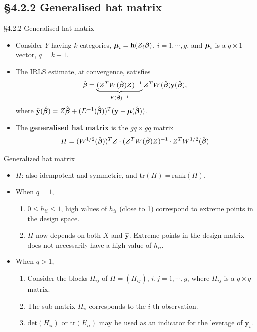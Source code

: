 \documentclass{beamer}
\newcommand{\currentsubsection}{}
\let\oldsubsection\subsection
\renewcommand{\subsection}[1]{\oldsubsection{#1}\renewcommand{\currentsubsection}{#1}}
\newenvironment{wideitemize}%
  {\begin{itemize}%
    \setlength{\parskip}{1em}}%
  {\end{itemize}}
\begin{document}
\subsection{\S4.2.2 Generalised hat matrix}
\begin{frame}{\S4.2.2 Generalised hat matrix}
\begin{wideitemize}

\item
Consider $Y$ having $k$ categories, $\mbox{\boldmath $\mu$}_i=\textbf{h}(Z_i\mbox{\boldmath $\beta$})$,
$i=1,\cdots,g$, and $\mbox{\boldmath $\mu$}_i$ is a $q\times 1$ vector, $q=k-1$.
\item
The IRLS estimate, at convergence, satisfies
\[
\hat{\mbox{\boldmath $\beta$}}=\underbrace{(Z^TW(\hat{\mbox{\boldmath $\beta$}})Z)^{-1}}_{F(\hat{\boldsymbol \beta})^{-1} }Z^TW(
\hat{\mbox{\boldmath $\beta$}})\tilde{\textbf{y}}(\hat{\mbox{\boldmath $\beta$}}) 
,
\]
where $\tilde{\textbf{y}}(\hat{\boldsymbol \beta})=Z\hat{\mbox{\boldmath $\beta$}}
+(D^{-1}(\hat{\mbox{\boldmath $\beta$}}))^T(\textbf{y}-\mbox{\boldmath $\mu$}(\hat{\mbox{\boldmath $\beta$}}))$.
\item
The \textbf{generalised hat matrix} is the $gq\times gq$ matrix
\[
H=(W^{1/2}(\hat{\mbox{\boldmath $\beta$}}))^T Z \cdot
(Z^TW(\hat{\mbox{\boldmath $\beta$}})Z)^{-1} \cdot
Z^TW^{1/2}(\hat{\mbox{\boldmath $\beta$}})
\]
\end{wideitemize}
\end{frame}

\begin{frame} {Generalized hat matrix }


\begin{wideitemize}
\item
$H$: also idempotent and symmetric, and 
$\mbox{tr}(H)=\mbox{rank}(H)$.
\item
When  $q=1$,
\begin{enumerate}
\item
$0\leq h_{ii}\leq 1$, high values of $h_{ii}$ (close to 1) correspond to extreme points in the design space.
\item
$H$ now depends on both $X$ and $\hat{\textbf{y}}$. Extreme points in the design matrix does not
necessarily have a high value of $h_{ii}$.
\end{enumerate}
\item 
When $q>1$,
\begin{enumerate}
\item
Consider the blocks $H_{ij}$ of $H=(H_{ij})$, $i,j=1,\cdots,g$, where
$H_{ij}$ is a $q\times q$ matrix.
\item
The sub-matrix $H_{ii}$ corresponds to the $i$-th observation. 
\item $\mbox{det}(H_{ii})$ or
$\mbox{tr}(H_{ii})$ may be used as an indicator for the leverage of $\textbf{y}_i$.
\end{enumerate}
\end{wideitemize}
\end{frame}
\end{document}

